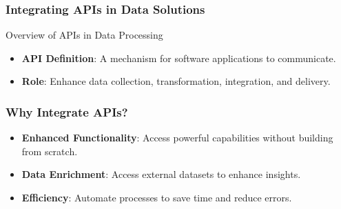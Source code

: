 \documentclass[aspectratio=169]{beamer}
\begin{document}
\begin{frame}
    \frametitle{Integrating APIs in Data Solutions}
    \begin{block}{Overview of APIs in Data Processing}
        \begin{itemize}
            \item \textbf{API Definition}: A mechanism for software applications to communicate.
            \item \textbf{Role}: Enhance data collection, transformation, integration, and delivery.
        \end{itemize}
    \end{block}
\end{frame}

\begin{frame}
    \frametitle{Why Integrate APIs?}
    \begin{itemize}
        \item \textbf{Enhanced Functionality}: Access powerful capabilities without building from scratch.
        \item \textbf{Data Enrichment}: Access external datasets to enhance insights.
        \item \textbf{Efficiency}: Automate processes to save time and reduce errors.
    \end{itemize}
\end{frame}
\end{document}
